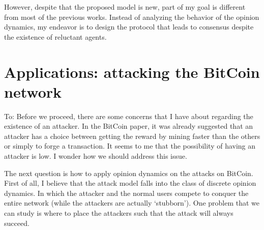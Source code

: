 \documentclass[10pt]{article}
\theoremstyle{t}
\begin{document}
However, despite that the proposed model is new, part of my goal is different from most of the previous works. Instead of analyzing the behavior of the opinion dynamics, my endeavor is to design the protocol that leads to consensus despite the existence of reluctant agents.

\section{Applications: attacking the BitCoin network}

{\color{red} To: Before we proceed, there are some concerns that I have about regarding the existence of an attacker. In the BitCoin paper, it was already suggested that an attacker has a choice between getting the reward by mining faster than the others or simply to forge a transaction. It seems to me that the possibility of having an attacker is low. I wonder how we should address this issue.}\vspace{.2cm}

The next question is how to apply opinion dynamics on the attacks on BitCoin. First of all, I believe that the attack model falls into the class of discrete opinion dynamics. In which the attacker and the normal users compete to conquer the entire network (while the attackers are actually `stubborn'). One problem that we can study is where to place the attackers such that the attack will always succeed. \vspace{.2cm}



\end{document}
